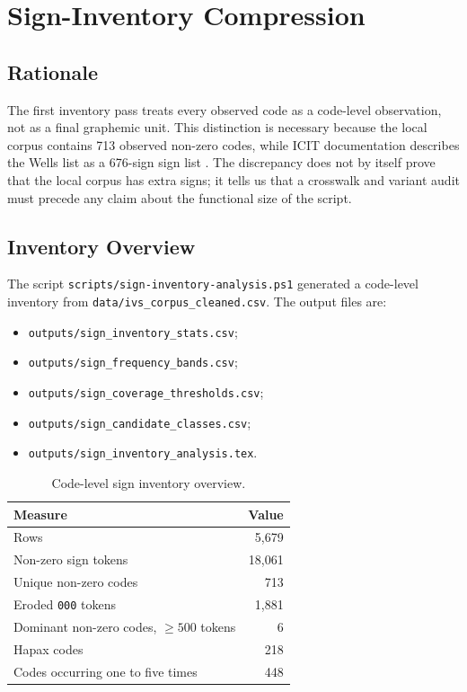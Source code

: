 \section{Sign-Inventory Compression}

\subsection{Rationale}

The first inventory pass treats every observed code as a code-level observation, not as a final graphemic unit. This distinction is necessary because the local corpus contains 713 observed non-zero codes, while ICIT documentation describes the Wells list as a 676-sign sign list \citep{fulsICIT}. The discrepancy does not by itself prove that the local corpus has extra signs; it tells us that a crosswalk and variant audit must precede any claim about the functional size of the script.

\subsection{Inventory Overview}

The script \texttt{scripts/sign-inventory-analysis.ps1} generated a code-level inventory from \texttt{data/ivs\_corpus\_cleaned.csv}. The output files are:

\begin{itemize}
  \item \texttt{outputs/sign\_inventory\_stats.csv};
  \item \texttt{outputs/sign\_frequency\_bands.csv};
  \item \texttt{outputs/sign\_coverage\_thresholds.csv};
  \item \texttt{outputs/sign\_candidate\_classes.csv};
  \item \texttt{outputs/sign\_inventory\_analysis.tex}.
\end{itemize}

\begin{table}[htbp]
\centering
\begin{tabular}{lr}
\toprule
\textbf{Measure} & \textbf{Value} \\
\midrule
Rows & 5,679 \\
Non-zero sign tokens & 18,061 \\
Unique non-zero codes & 713 \\
Eroded \texttt{000} tokens & 1,881 \\
Dominant non-zero codes, $\geq 500$ tokens & 6 \\
Hapax codes & 218 \\
Codes occurring one to five times & 448 \\
\bottomrule
\end{tabular}
\caption{Code-level sign inventory overview.}
\label{tab:inventory-overview}
\end{table}

